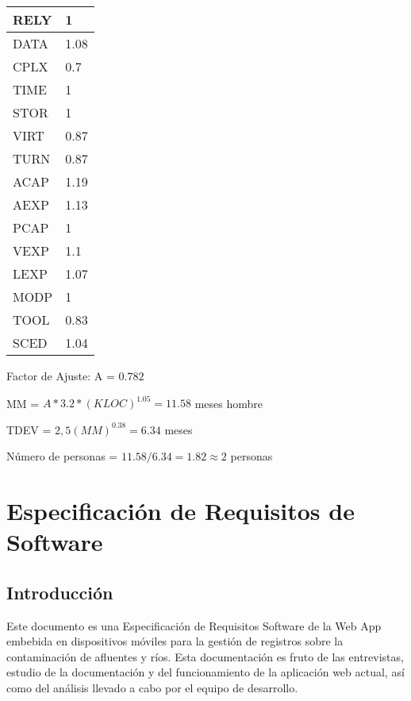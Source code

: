 \begin{table}[H]
\centering
    \begin{tabular}{|l|l|}
        \hline
        RELY & 1    \\ \hline
        DATA & 1.08 \\ \hline
        CPLX & 0.7  \\ \hline
        TIME & 1    \\ \hline
        STOR & 1    \\ \hline
        VIRT & 0.87 \\ \hline
        TURN & 0.87 \\ \hline
        ACAP & 1.19 \\ \hline
        AEXP & 1.13 \\ \hline
        PCAP & 1    \\ \hline
        VEXP & 1.1  \\ \hline
        LEXP & 1.07 \\ \hline
        MODP & 1    \\ \hline
        TOOL & 0.83 \\ \hline
        SCED & 1.04 \\
        \hline
    \end{tabular}
\end{table}
    
    
Factor de Ajuste: A = $0.782$
\\

\begin{framed}
\centering
MM = $A*3.2*(KLOC)^{1.05} = 11.58$ meses hombre

TDEV = $2,5 (MM)^{0.38} = 6.34$ meses

Número de personas = ${11.58}/{6.34} = 1.82 \approx 2$ personas
\end{framed}

\section{Especificación de Requisitos de Software}
\setcounter{secnumdepth}{2}
\renewcommand{\thesubsection}{\arabic{subsection}}
 \subsection{Introducción}
 
 Este documento es una Especificación de Requisitos Software de la  Web App embebida en dispositivos móviles para la gestión de registros sobre la contaminación de afluentes y ríos. Esta documentación es fruto de las entrevistas, estudio de la documentación y del funcionamiento de la aplicación web actual, así como del análisis llevado a cabo por el equipo de desarrollo.

